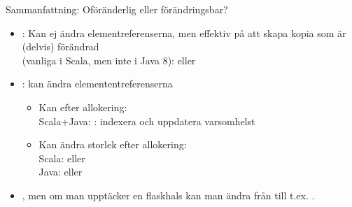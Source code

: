 \begin{Slide}{Sammanfattning: Oföränderlig eller förändringsbar?}
\begin{itemize}
\item {}:  Kan ej ändra elementreferenserna, men effektiv på att skapa kopia som är (delvis) förändrad\\(vanliga i Scala, men inte i Java 8):  eller 

\item {}: kan ändra elemententreferenserna
  \begin{itemize}
  \item Kan  efter allokering: \\ Scala+Java: : indexera och uppdatera varsomhelst
  \item Kan ändra storlek efter allokering:
  \\ Scala:  eller 
  \\ Java:  eller 
  \end{itemize}
\item {}, men om man  upptäcker en flaskhals kan man ändra från  till t.ex. .
\end{itemize}
\end{Slide}



